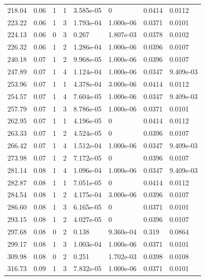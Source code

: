 \documentclass[preview]{standalone}
\begin{document}
{{\begin{tabular}{L{1.2cm}C{1.2cm} C{0.3cm}C{0.5cm} C{1.4cm}C{1.4cm} C{1.4cm}C{1.4cm}}
  218.04  &  0.06  & 1     &  1 &  3.585e-05  & 0  & 0.0414 &  0.0112   \\ 
  223.22  &  0.06  & 1     &  3 &  1.793e-04  & 1.000e-06  & 0.0371 &  0.0101   \\ 
  224.13  &  0.06  & 0     &  3 &  0.267  & 1.807e-03  & 0.0378 &  0.0102   \\ 
  226.32  &  0.06  & 1     &  2 &  1.286e-04  & 1.000e-06  & 0.0396 &  0.0107   \\ 
  240.18  &  0.07  & 1     &  2 &  9.968e-05  & 1.000e-06  & 0.0396 &  0.0107   \\ 
  247.89  &  0.07  & 1     &  4 &  1.124e-04  & 1.000e-06  & 0.0347 &  9.409e-03   \\ 
  253.96  &  0.07  & 1     &  1 &  4.378e-04  & 3.000e-06  & 0.0414 &  0.0112   \\ 
  254.57  &  0.07  & 1     &  4 &  7.604e-05  & 1.000e-06  & 0.0347 &  9.409e-03   \\ 
  257.79  &  0.07  & 1     &  3 &  8.786e-05  & 1.000e-06  & 0.0371 &  0.0101   \\ 
  262.95  &  0.07  & 1     &  1 &  4.196e-05  & 0  & 0.0414 &  0.0112   \\ 
  263.33  &  0.07  & 1     &  2 &  4.524e-05  & 0  & 0.0396 &  0.0107   \\ 
  266.42  &  0.07  & 1     &  4 &  1.512e-04  & 1.000e-06  & 0.0347 &  9.409e-03   \\ 
  273.98  &  0.07  & 1     &  2 &  7.172e-05  & 0  & 0.0396 &  0.0107   \\ 
  281.14  &  0.08  & 1     &  4 &  1.096e-04  & 1.000e-06  & 0.0347 &  9.409e-03   \\ 
  282.87  &  0.08  & 1     &  1 &  7.051e-05  & 0  & 0.0414 &  0.0112   \\ 
  284.54  &  0.08  & 1     &  2 &  4.175e-04  & 3.000e-06  & 0.0396 &  0.0107   \\ 
  286.60  &  0.08  & 1     &  3 &  6.165e-05  & 0  & 0.0371 &  0.0101   \\ 
  293.15  &  0.08  & 1     &  2 &  4.027e-05  & 0  & 0.0396 &  0.0107   \\ 
  297.68  &  0.08  & 0     &  2 &  0.138  & 9.360e-04  & 0.319 &  0.0864   \\ 
  299.17  &  0.08  & 1     &  3 &  1.003e-04  & 1.000e-06  & 0.0371 &  0.0101   \\ 
  309.98  &  0.08  & 0     &  2 &  0.251  & 1.702e-03  & 0.0398 &  0.0108   \\ 
  316.73  &  0.09  & 1     &  3 &  7.832e-05  & 1.000e-06  & 0.0371 &  0.0101   \\ 

\end{tabular}}}
\end{document}
